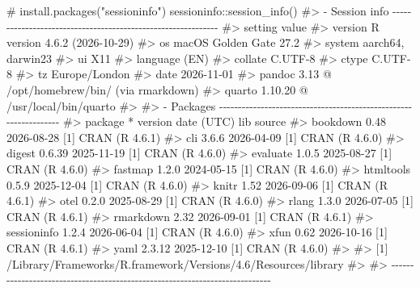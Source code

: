 \documentclass[
  10pt,
  a4paper,
]{book}
\newenvironment{Shaded}{\begin{snugshade}}{\end{snugshade}}
\newcommand{\CommentTok}[1]{\textcolor[rgb]{0.37,0.37,0.37}{#1}}
\newcommand{\FunctionTok}[1]{\textcolor[rgb]{0.28,0.35,0.67}{#1}}
\newcommand{\NormalTok}[1]{\textcolor[rgb]{0.00,0.46,0.62}{#1}}
\newcommand{\SpecialCharTok}[1]{\textcolor[rgb]{0.37,0.37,0.37}{#1}}
\begin{document}
\begin{Shaded}
\begin{Highlighting}[]
\CommentTok{\# install.packages("sessioninfo")}
\NormalTok{sessioninfo}\SpecialCharTok{::}\FunctionTok{session\_info}\NormalTok{()}
\CommentTok{\#\textgreater{} {-} Session info {-}{-}{-}{-}{-}{-}{-}{-}{-}{-}{-}{-}{-}{-}{-}{-}{-}{-}{-}{-}{-}{-}{-}{-}{-}{-}{-}{-}{-}{-}{-}{-}{-}{-}{-}{-}{-}{-}{-}{-}{-}{-}{-}{-}{-}{-}{-}{-}{-}{-}{-}{-}{-}{-}{-}{-}{-}{-}{-}{-}{-}}
\CommentTok{\#\textgreater{}  setting  value}
\CommentTok{\#\textgreater{}  version  R version 4.6.2 (2026{-}10{-}29)}
\CommentTok{\#\textgreater{}  os       macOS Golden Gate 27.2}
\CommentTok{\#\textgreater{}  system   aarch64, darwin23}
\CommentTok{\#\textgreater{}  ui       X11}
\CommentTok{\#\textgreater{}  language (EN)}
\CommentTok{\#\textgreater{}  collate  C.UTF{-}8}
\CommentTok{\#\textgreater{}  ctype    C.UTF{-}8}
\CommentTok{\#\textgreater{}  tz       Europe/London}
\CommentTok{\#\textgreater{}  date     2026{-}11{-}01}
\CommentTok{\#\textgreater{}  pandoc   3.13 @ /opt/homebrew/bin/ (via rmarkdown)}
\CommentTok{\#\textgreater{}  quarto   1.10.20 @ /usr/local/bin/quarto}
\CommentTok{\#\textgreater{} }
\CommentTok{\#\textgreater{} {-} Packages {-}{-}{-}{-}{-}{-}{-}{-}{-}{-}{-}{-}{-}{-}{-}{-}{-}{-}{-}{-}{-}{-}{-}{-}{-}{-}{-}{-}{-}{-}{-}{-}{-}{-}{-}{-}{-}{-}{-}{-}{-}{-}{-}{-}{-}{-}{-}{-}{-}{-}{-}{-}{-}{-}{-}{-}{-}{-}{-}{-}{-}{-}{-}{-}{-}}
\CommentTok{\#\textgreater{}  package     * version date (UTC) lib source}
\CommentTok{\#\textgreater{}  bookdown      0.48    2026{-}08{-}28 [1] CRAN (R 4.6.1)}
\CommentTok{\#\textgreater{}  cli           3.6.6   2026{-}04{-}09 [1] CRAN (R 4.6.0)}
\CommentTok{\#\textgreater{}  digest        0.6.39  2025{-}11{-}19 [1] CRAN (R 4.6.0)}
\CommentTok{\#\textgreater{}  evaluate      1.0.5   2025{-}08{-}27 [1] CRAN (R 4.6.0)}
\CommentTok{\#\textgreater{}  fastmap       1.2.0   2024{-}05{-}15 [1] CRAN (R 4.6.0)}
\CommentTok{\#\textgreater{}  htmltools     0.5.9   2025{-}12{-}04 [1] CRAN (R 4.6.0)}
\CommentTok{\#\textgreater{}  knitr         1.52    2026{-}09{-}06 [1] CRAN (R 4.6.1)}
\CommentTok{\#\textgreater{}  otel          0.2.0   2025{-}08{-}29 [1] CRAN (R 4.6.0)}
\CommentTok{\#\textgreater{}  rlang         1.3.0   2026{-}07{-}05 [1] CRAN (R 4.6.1)}
\CommentTok{\#\textgreater{}  rmarkdown     2.32    2026{-}09{-}01 [1] CRAN (R 4.6.1)}
\CommentTok{\#\textgreater{}  sessioninfo   1.2.4   2026{-}06{-}04 [1] CRAN (R 4.6.0)}
\CommentTok{\#\textgreater{}  xfun          0.62    2026{-}10{-}16 [1] CRAN (R 4.6.1)}
\CommentTok{\#\textgreater{}  yaml          2.3.12  2025{-}12{-}10 [1] CRAN (R 4.6.0)}
\CommentTok{\#\textgreater{} }
\CommentTok{\#\textgreater{}  [1] /Library/Frameworks/R.framework/Versions/4.6/Resources/library}
\CommentTok{\#\textgreater{} }
\CommentTok{\#\textgreater{} {-}{-}{-}{-}{-}{-}{-}{-}{-}{-}{-}{-}{-}{-}{-}{-}{-}{-}{-}{-}{-}{-}{-}{-}{-}{-}{-}{-}{-}{-}{-}{-}{-}{-}{-}{-}{-}{-}{-}{-}{-}{-}{-}{-}{-}{-}{-}{-}{-}{-}{-}{-}{-}{-}{-}{-}{-}{-}{-}{-}{-}{-}{-}{-}{-}{-}{-}{-}{-}{-}{-}{-}{-}{-}{-}{-}}
\end{Highlighting}
\end{Shaded}
\end{document}
